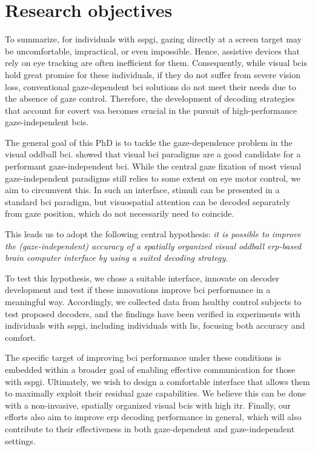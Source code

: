 \section{Research objectives}
\label{sec:gaze-independence/objectives}

To summarize, for individuals with \ac{sspgi}, gazing directly at a screen target may
be uncomfortable, impractical, or even impossible.
Hence, assistive devices that rely on eye tracking are often inefficient for
them.
Consequently, while visual \acp{bci} hold great promise for these individuals,
if they do not suffer from severe vision loss, conventional
gaze-dependent \ac{bci} solutions do not meet their needs due to the absence of gaze
control.
Therefore, the development of decoding strategies that account for covert
\ac{vsa} becomes crucial in the pursuit of high-performance gaze-independent
\acp{bci}.

The general goal of this PhD is to tackle the gaze-dependence problem in the
visual oddball \ac{bci}.
 showed that visual \ac{bci} paradigms are a
good candidate for a performant gaze-independent \ac{bci}.
While the central gaze fixation of most visual gaze-independent paradigms still
relies to some extent on eye motor control, we aim to circumvent this.
In such an interface, stimuli can be presented in a standard \ac{bci} paradigm, but
visuospatial attention can be decoded separately from gaze position, which do not necessarily need to coincide.

This leads us to adopt the following central hypothesis:
\emph{it is possible to improve the (gaze-independent) accuracy of a spatially
organized visual oddball \ac{erp}-based brain computer interface by using a
suited decoding strategy}.

To test this hypothesis, we chose a suitable interface, innovate on decoder
development and test if these innovations improve \ac{bci} performance in a
meaningful way.
Accordingly, we collected data from healthy control subjects to test proposed
decoders, and the findings have been verified in experiments with
individuals with \ac{sspgi}, including individuals with \ac{lis}, focusing
both accuracy and comfort.

The specific target of improving \ac{bci} performance under these conditions
is embedded within a broader goal of enabling effective communication for those with \ac{sspgi}.
Ultimately, we wish to design a comfortable interface that allows them to maximally exploit
their residual gaze capabilities.
We believe this can be done with a non-invasive, spatially
organized visual \acp{bci} with high \ac{itr}.
Finally, our efforts also aim to improve \ac{erp} decoding performance
in general, which will also contribute to their effectiveness in both gaze-dependent
and gaze-independent settings.


